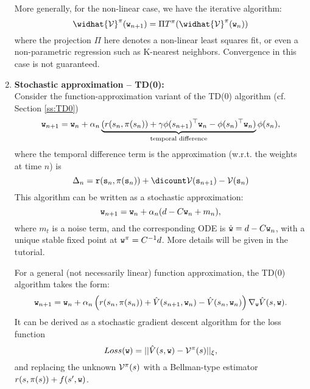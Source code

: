\begin{enumerate}
More generally, for the non-linear case, we have the iterative algorithm:
$$\widhat{\Value}^\policy(\weights_{n+1}) = \Pi T^\policy( \widhat{\Value}^\policy(\weights_{n}))$$
where the projection $\Pi$ here denotes a non-linear least squares fit, or even a non-parametric regression such as K-nearest neighbors. Convergence in this case is not guaranteed.

\item \textbf{Stochastic approximation -- TD(0):}\\
Consider the function-approximation variant of the TD(0) algorithm (cf. Section \ref{ss:TD0})
\begin{equation*}
    \texttt{w}_{n+1} = \texttt{w}_n + \alpha_n \underbrace{( r(s_n,\pi(s_n)) +\gamma {\phi}(s_{n+1})^\top \texttt{w}_n - {\phi}(s_{n})^\top \texttt{w}_n)}_{\textrm{temporal difference}} \phi(s_{n}),
\end{equation*}
where the temporal difference term is the approximation (w.r.t. the weights at time $n$) is 
$$\Delta_{n}= \reward(\state_{n},\policy(\state_{n})) +\dicount \Value(\state_{n+1}) - \Value(\state_{n})$$
This algorithm can be written as a stochastic approximation:
\begin{equation*}
    \texttt{w}_{n+1} = \texttt{w}_n + \alpha_n ( d -  C \texttt{w}_n + m_n ),
\end{equation*}
where $m_t$ is a noise term, and the corresponding ODE is $\dot{\texttt{w}} = d -  C \texttt{w}_n$, with a unique stable fixed point at $\texttt{w}^{\pi} = C^{-1}d$. More details will be given in the tutorial.

For a general (not necessarily linear) function approximation, the TD(0) algorithm takes the form:
\begin{equation*}
    \texttt{w}_{n+1} = \texttt{w}_n + \alpha_n \left( r(s_n,\pi(s_n)) + \hat{V}(s_{n+1},\texttt{w}_n) - \hat{V}(s_{n},\texttt{w}_n) \right) \nabla_{\texttt{w}} \hat{V}(s,\texttt{w}).
\end{equation*}
It can be derived as a stochastic gradient descent algorithm for the loss function
\begin{equation*}
    Loss(\texttt{w}) = ||\hat{V}(s,\texttt{w}) - \mathcal{V}^\pi(s)||_\xi,
\end{equation*}
and replacing the unknown $\mathcal{V}^\pi(s)$ with a Bellman-type estimator $r(s,\pi(s))+f(s',\texttt{w})$.
\end{enumerate}
%

